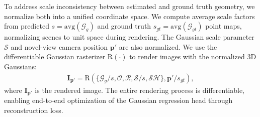 To address scale inconsistency between estimated and ground truth geometry, we normalize both into a unified coordinate space. We compute average scale factors from predicted $s = \mathrm{avg}(\mathcal{G}_g)$ and ground truth $s_{gt} = \mathrm{avg}(\mathcal{G}_{gt})$ point maps, normalizing scenes to unit space during rendering. The Gaussian scale parameter $\mathcal{S}$ and novel-view camera position $\mathbf{p}'$ are also normalized.
%
We use the differentiable Gaussian rasterizer $\mathrm{R}(\cdot)$ to render images with the normalized 3D Gaussians:
\begin{align}
   \mathbf{I}_{\mathbf{p}'} = \mathrm{R}(\{\mathcal{G}_g/s, \mathcal{O}, \mathcal{R}, \mathcal{S}/s, \mathcal{SH}\}, \mathbf{p}'/s_{gt}),
\end{align}
where $\mathbf{I}_{\mathbf{p}'}$ is the rendered image. The entire rendering process is differentiable, enabling end-to-end optimization of the Gaussian regression head through reconstruction loss.









